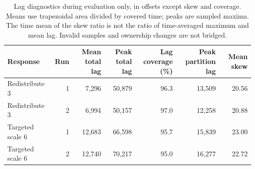 \begin{table}[!htbp]
\centering\small
\setlength{\tabcolsep}{3pt}
\renewcommand{\arraystretch}{1.12}
\begin{tabular}{@{}lrrrrrr@{}}
\toprule
Response & Run & \shortstack{Mean total\\lag} & \shortstack{Peak total\\lag} & \shortstack{Lag coverage\\(\%)} & \shortstack{Peak partition\\lag} & Mean skew\\
\midrule
Redistribute 3 & 1 & 7,296 & 50,879 & 96.3 & 13,509 & 20.56\\
Redistribute 3 & 2 & 6,994 & 50,157 & 97.0 & 12,258 & 20.88\\
Targeted scale 6 & 1 & 12,683 & 66,598 & 95.7 & 15,839 & 23.00\\
Targeted scale 6 & 2 & 12,740 & 70,217 & 95.0 & 16,277 & 22.72\\
\bottomrule
\end{tabular}
\caption{Lag diagnostics during evaluation only, in offsets except skew and coverage. Means use trapezoidal area divided by covered time; peaks are sampled maxima. The time mean of the skew ratio is not the ratio of time-averaged maximum and mean lag. Invalid samples and ownership changes are not bridged.}
\label{tab:four-partition-diagnostics}
\end{table}
